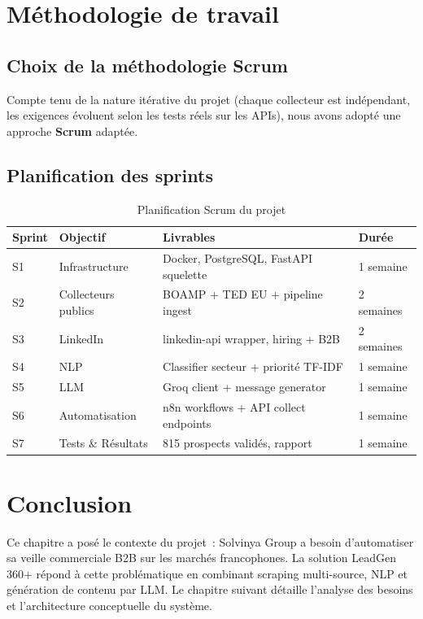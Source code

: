 \section{Méthodologie de travail}

\subsection{Choix de la méthodologie Scrum}

Compte tenu de la nature itérative du projet (chaque collecteur est indépendant,
les exigences évoluent selon les tests réels sur les APIs), nous avons adopté
une approche \textbf{Scrum} adaptée.

\subsection{Planification des sprints}

\begin{table}[H]
  \centering
  \begin{tabular}{C{1.5cm} L{4cm} L{5cm} C{2cm}}
    \toprule
    \textbf{Sprint} & \textbf{Objectif} & \textbf{Livrables} & \textbf{Durée} \\
    \midrule
    S1 & Infrastructure & Docker, PostgreSQL, FastAPI squelette & 1 semaine \\
    \addlinespace
    S2 & Collecteurs publics & BOAMP + TED EU + pipeline ingest & 2 semaines \\
    \addlinespace
    S3 & LinkedIn & linkedin-api wrapper, hiring + B2B & 2 semaines \\
    \addlinespace
    S4 & NLP & Classifier secteur + priorité TF-IDF & 1 semaine \\
    \addlinespace
    S5 & LLM & Groq client + message generator & 1 semaine \\
    \addlinespace
    S6 & Automatisation & n8n workflows + API collect endpoints & 1 semaine \\
    \addlinespace
    S7 & Tests \& Résultats & 815 prospects validés, rapport & 1 semaine \\
    \bottomrule
  \end{tabular}
  \caption{Planification Scrum du projet}
  \label{tab:sprints}
\end{table}

\section{Conclusion}

Ce chapitre a posé le contexte du projet~: Solvinya Group a besoin d'automatiser
sa veille commerciale B2B sur les marchés francophones. La solution LeadGen 360+
répond à cette problématique en combinant scraping multi-source, NLP et génération
de contenu par LLM. Le chapitre suivant détaille l'analyse des besoins et
l'architecture conceptuelle du système.
